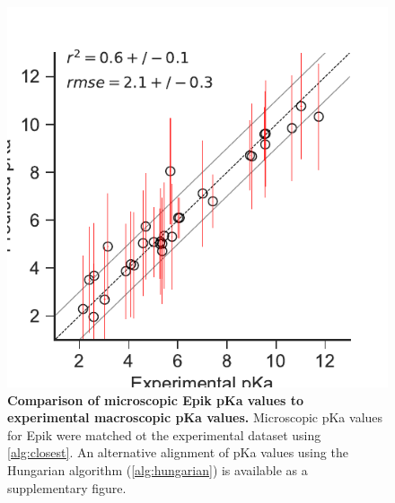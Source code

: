 \documentclass[9pt,lineno,final]{elife}
\begin{document}
\begin{figure}[H]
\centering
\includegraphics[]{closest_pka_epik_typeI.pdf}
\caption{{\bf Comparison of microscopic Epik pKa values to experimental macroscopic pKa values.} Microscopic pKa values for Epik were matched ot the experimental dataset using \cref{alg:closest}. An alternative alignment of pKa values using the Hungarian algorithm (\cref{alg:hungarian}) is available as a supplementary figure. \label{correlation-closest-epiki}}


\end{figure}
    
\end{document}
